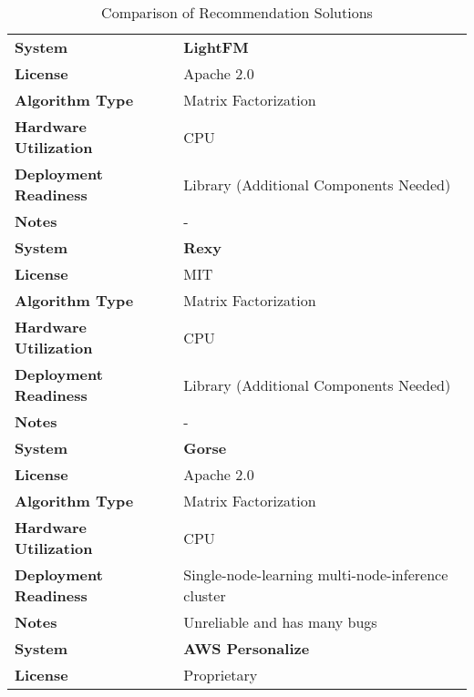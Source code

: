 \begin{table}[h]
    \centering
    \caption{Comparison of Recommendation Solutions}
    \footnotesize
    \setlength{\tabcolsep}{12pt} %
    \renewcommand{\arraystretch}{1.5} %
    \begin{tabular}{|l|l|}
        \hline
        \textbf{System} & \textbf{LightFM} \\
        \cline{2-2}
        \textbf{License} & Apache 2.0 \\
        \cline{2-2}
        \textbf{Algorithm Type} & Matrix Factorization \\
        \cline{2-2}
        \textbf{Hardware Utilization} & CPU \\
        \cline{2-2}
        \textbf{Deployment Readiness} & Library (Additional Components Needed) \\
        \cline{2-2}
        \textbf{Notes} & - \\
        \hline
        \hline
        \textbf{System} & \textbf{Rexy} \\
        \cline{2-2}
        \textbf{License} & MIT \\
        \cline{2-2}
        \textbf{Algorithm Type} & Matrix Factorization \\
        \cline{2-2}
        \textbf{Hardware Utilization} & CPU \\
        \cline{2-2}
        \textbf{Deployment Readiness} & Library (Additional Components Needed) \\
        \cline{2-2}
        \textbf{Notes} & - \\
        \hline
        \hline
        \textbf{System} & \textbf{Gorse} \\
        \cline{2-2}
        \textbf{License} & Apache 2.0 \\
        \cline{2-2}
        \textbf{Algorithm Type} & Matrix Factorization \\
        \cline{2-2}
        \textbf{Hardware Utilization} & CPU \\
        \cline{2-2}
        \textbf{Deployment Readiness} & Single-node-learning multi-node-inference cluster \\
        \cline{2-2}
        \textbf{Notes} & Unreliable and has many bugs \\
        \hline
        \hline
        \textbf{System} &\textbf{AWS Personalize} \\
        \cline{2-2}
        \textbf{License} & Proprietary \\

\end{tabular}
\end{table}
